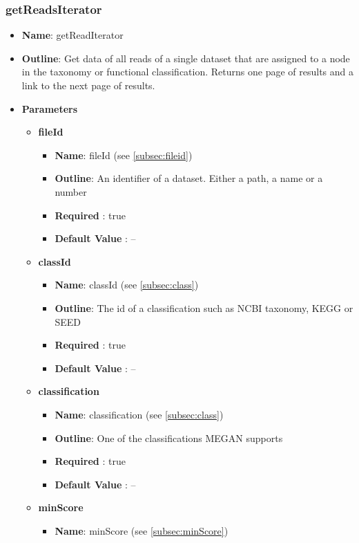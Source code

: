 \documentclass[11pt]{article}
\begin{document}
\subsubsection{getReadsIterator}
\begin{itemize}
	\item \textbf{Name}: getReadIterator
	\item \textbf{Outline}: Get data of all reads of a single dataset that are assigned to a node in the taxonomy or functional classification. Returns one page of results and a link to the next page of results.
	\item \textbf{Parameters}
		\begin{itemize}
			\item \textbf{fileId}
				\begin{itemize}
					\item \textbf{Name}: fileId (see \ref{subsec:fileid})
					\item \textbf{Outline}: An identifier of a dataset. Either a path, a name or a number
					\item \textbf{Required} : true
					\item \textbf{Default Value} : --
				\end{itemize}
			\item \textbf{classId}
				\begin{itemize}
					\item \textbf{Name}: classId (see \ref{subsec:class})
					\item \textbf{Outline}: The id of a classification such as NCBI taxonomy, KEGG or SEED
					\item \textbf{Required} : true
					\item \textbf{Default Value} : --
				\end{itemize}
			\item \textbf{classification}
				\begin{itemize}
					\item \textbf{Name}: classification (see \ref{subsec:class})
					\item \textbf{Outline}: One of the classifications MEGAN supports
					\item \textbf{Required} : true
					\item \textbf{Default Value} : --
				\end{itemize}
			\item \textbf{minScore}
				\begin{itemize}
					\item \textbf{Name}: minScore (see \ref{subsec:minScore})

\end{itemize}
\end{itemize}
\end{itemize}
\end{document}
